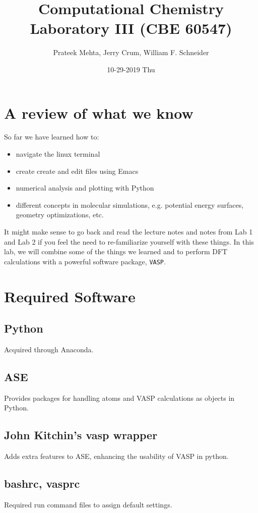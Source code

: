 \documentclass[11pt]{article}
\author{Prateek Mehta, Jerry Crum,  William F. Schneider}
\date{10-29-2019 Thu}
\title{Computational Chemistry Laboratory III (CBE 60547)}
\begin{document}
\maketitle


\section{A review of what we know}
\label{sec:orgf806459}

So far we have learned how to:

\begin{itemize}
\item navigate the linux terminal

\item create create and edit files using Emacs

\item numerical analysis and plotting with Python

\item different concepts in molecular simulations, e.g. potential energy surfaces, geometry optimizations, etc.
\end{itemize}

It might make sense to go back and read the lecture notes and notes from Lab 1 and Lab 2 if you feel the need to re-familiarize yourself with these things. In this lab, we will combine some of the things we learned and to perform DFT calculations with a powerful software package, \texttt{VASP}. 


\section{Required Software}
\label{sec:org8802e8b}
\subsection{Python}
\label{sec:org2c870be}
Acquired through Anaconda.
\subsection{ASE}
\label{sec:org8dd72ec}
Provides packages for handling atoms and VASP calculations as objects in Python. 
\subsection{John Kitchin's vasp wrapper}
\label{sec:orgac02815}
Adds extra features to ASE, enhancing the usability of VASP in python.
\subsection{bashrc, vasprc}
\label{sec:orge8491ba}
Required run command files to assign default settings. 
\end{document}
